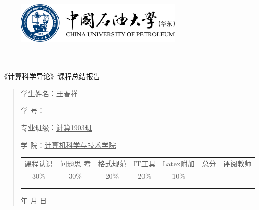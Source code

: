 \documentclass{article}
\renewcommand{\today}{\number\year 年 \number\month 月 \number\day 日}
\begin{document}
\begin{figure}
    \centering
    \includegraphics[width=8cm]{upc.png}

    \label{figupc}
\end{figure}

	\begin{center}
		\quad \\
		\quad \\
		\heiti \fontsize{45}{17} \quad \quad \quad 
		\vskip 1.5cm
		\heiti {} 《计算科学导论》课程总结报告
	\end{center}
	\vskip 2.0cm
		
	\begin{quotation}
		\doublespacing
		
        \par\setlength\parindent{7em}
		\quad 

		学生姓名：\underline{\qquad  王春祥 \qquad \qquad}

		学\hspace{0.61cm} 号：\underline{ \qquad}
		
		专业班级：\underline{\qquad 计算1903班 \qquad  }
		
        学\hspace{0.61cm} 院：\underline{计算机科学与技术学院}
		\vskip 2cm
		\centering
		\begin{table}[h]
            \centering 
            \begin{tabular}{|c|c|c|c|c|c|c|}
                \hline
                课程认识 & 问题思 考 & 格式规范  & IT工具  & Latex附加  & 总分 & 评阅教师 \\
                30\% & 30\% & 20\% & 20\% & 10\% &  &  \\
                \hline
                 & & & & & &\\
                & & & & & &\\
                \hline
            \end{tabular}
        \end{table}
		\vskip 2cm
		\today
	\end{quotation}
\end{document}
